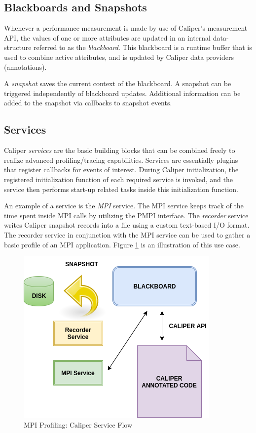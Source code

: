 \subsection{Blackboards and Snapshots}
Whenever a performance measurement is made by use of Caliper's measurement API, the values of one or more attributes are updated in an internal data-structure referred to as the \textit{blackboard}. This blackboard is a runtime buffer that is used to combine active attributes, and is updated by Caliper data providers (annotations).
\par A \textit{snapshot} saves the current context of the blackboard. A snapshot can be triggered independently of blackboard updates. Additional information can be added to the snapshot via callbacks to snapshot events. 
\subsection{Services}
Caliper \emph{services} are the basic building blocks that can be combined freely to realize advanced profiling/tracing capabilities. Services are essentially plugins that register callbacks for events of interest. During Caliper initialization, the registered initialization function of each required service is invoked, and the service then performs start-up related tasks inside this initialization function. 
\par An example of a service is the \textit{MPI} service. The MPI service keeps track of the time spent inside MPI calls by utilizing the PMPI interface. The \textit{recorder} service writes Caliper snapshot records into a file using a custom text-based I/O format. The recorder service in conjunction with the MPI service can be used to gather a basic profile of an MPI application. Figure \ref{fig:caliservices} is an illustration of this use case. 
\begin{center}
	\begin{figure}[bp!]
         \centering
  \captionsetup{justification=centering}
		\includegraphics[scale=0.7, keepaspectratio]{figures/cali-services}
		\caption{MPI Profiling: Caliper Service Flow}
		\label{fig:caliservices}
	\end{figure}
\end{center}

